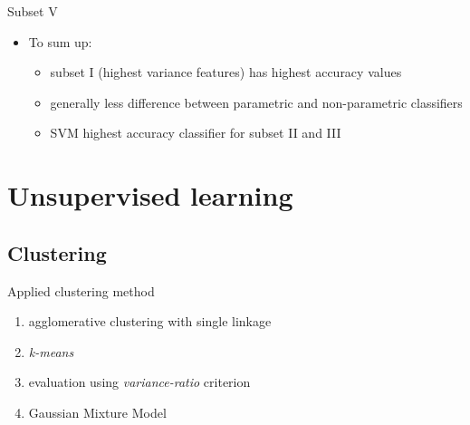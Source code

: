 \documentclass{beamer}
\begin{document}
\begin{frame}{Subset V}
  \begin{itemize}
  \item
    To sum up:
    \begin{itemize}
    \item
      subset I (highest variance features) has highest accuracy values
    \item
      generally less difference between parametric and non-parametric classifiers
      \item
      SVM highest accuracy classifier for subset II and III
          \end{itemize}
  \end{itemize}
\end{frame}


\section{Unsupervised learning}
\subsection{Clustering}

\begin{frame}{Applied clustering method}
	\begin{enumerate}
		\item{
		agglomerative clustering with single linkage
		}
		\item{
		\emph{k-means} 
		}
		\item{
		evaluation using \emph{variance-ratio} criterion
		}
		\item{
		Gaussian Mixture Model
		}
	\end{enumerate}
\end{frame}
\end{document}
